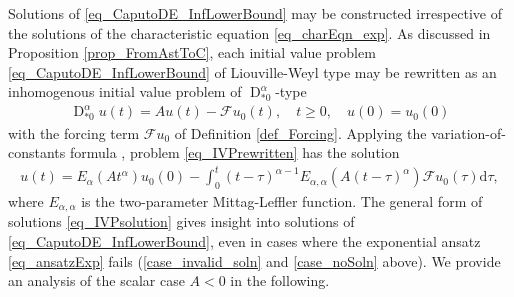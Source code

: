 \documentclass{svproc}
\newcommand{\dsomething}[1]{\mathrm{d}#1}
\newcommand{\AstderivativeInput}[2]{\operatorname{D}_{\ast #2}^{#1}}
\begin{document}
		Solutions of \eqref{eq_CaputoDE_InfLowerBound} may be constructed irrespective of the solutions of the characteristic equation \eqref{eq_charEqn_exp}. As discussed in {Proposition \ref{prop_FromAstToC}}, each initial value problem \eqref{eq_CaputoDE_InfLowerBound} of Liouville-Weyl type may be rewritten as an inhomogenous initial value problem of {$\AstderivativeInput{\alpha}{0}$-type}
			\begin{align}\label{eq_IVPrewritten}
				{\AstderivativeInput{\alpha}{0}}u(t) = Au(t) - \mathcal{F}u_0 (t),\quad t\geq 0, \quad u(0) = u_0(0)
			\end{align}
		with the forcing term $\mathcal F u_0$ of Definition \ref{def_Forcing}.
		Applying the variation-of-constants formula \cite{Diethelm2010}, problem \eqref{eq_IVPrewritten} has the solution
		\begin{align}\label{eq_IVPsolution}
			u(t) = E_\alpha (A t^\alpha)u_0(0) -\int_0^t (t-\tau)^{\alpha-1} E_{\alpha,\alpha}(A(t-\tau)^\alpha) \mathcal F u_0(\tau) \dsomething{\tau},
		\end{align}
	where $E_{\alpha,\alpha}$ is the two-parameter Mittag-Leffler function. 
	{The general form of solutions \eqref{eq_IVPsolution} gives insight into solutions of \eqref{eq_CaputoDE_InfLowerBound}, even in cases where the exponential ansatz \eqref{eq_ansatzExp} fails (\ref{case_invalid_soln} and \ref{case_noSoln} above).  We provide an analysis of the scalar case $A<0$ in the following.}
	
\end{document}
